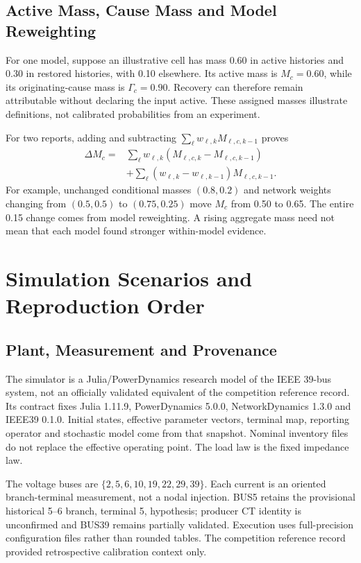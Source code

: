 \subsection{Active Mass, Cause Mass and Model Reweighting}

For one model, suppose an illustrative cell has mass 0.60 in active
histories and 0.30 in restored histories, with 0.10 elsewhere. Its active
mass is $M_c=0.60$, while its originating-cause mass is $\Gamma_c=0.90$.
Recovery can therefore remain attributable without declaring the input
active. These assigned masses illustrate definitions, not calibrated
probabilities from an experiment.

For two reports, adding and subtracting
$\sum_\ell w_{\ell,k}M_{\ell,c,k-1}$ proves
\begin{align}
 \Delta M_c={}&\sum_\ell w_{\ell,k}
       (M_{\ell,c,k}-M_{\ell,c,k-1})\nonumber\\
 &+\sum_\ell(w_{\ell,k}-w_{\ell,k-1})M_{\ell,c,k-1}.
\end{align}
For example, unchanged conditional masses $(0.8,0.2)$ and network weights
changing from $(0.5,0.5)$ to $(0.75,0.25)$ move $M_c$ from 0.50 to 0.65.
The entire 0.15 change comes from model reweighting. A rising aggregate
mass need not mean that each model found stronger within-model evidence.

\section{Simulation Scenarios and Reproduction Order}
\label{app:current-scenarios}

\subsection{Plant, Measurement and Provenance}

The simulator is a Julia/PowerDynamics research model of the IEEE 39-bus
system, not an officially validated equivalent of the competition
reference record. Its contract fixes Julia 1.11.9, PowerDynamics 5.0.0,
NetworkDynamics 1.3.0 and IEEE39 0.1.0. Initial states, effective parameter
vectors, terminal map, reporting operator and stochastic model come from
that snapshot. Nominal inventory files do not replace the effective
operating point. The load law is the fixed impedance law.

The voltage buses are $\{2,5,6,10,19,22,29,39\}$. Each current is an
oriented branch-terminal measurement, not a nodal injection. BUS5 retains
the provisional historical 5--6 branch, terminal 5, hypothesis; producer
CT identity is unconfirmed and BUS39 remains partially validated.
Execution uses full-precision configuration files rather than rounded
tables. The competition reference record provided retrospective calibration
context only.

